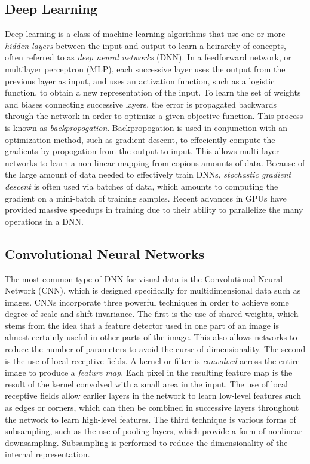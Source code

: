 \documentclass{article}
\begin{document}
\subsection{Deep Learning}
Deep learning is a class of machine learning algorithms that use one or more \textit{hidden layers} between the input and output
to learn a heirarchy of concepts, often referred to as \textit{deep neural networks} (DNN).
In a feedforward network, or multilayer perceptron (MLP), each successive layer uses the output
from the previous layer as input, and uses an activation function, such as a logistic function, to obtain a new representation of the input. To
learn the set of weights and biases connecting successive layers, the error is propagated backwards through the network in order to optimize a
given objective function. This process is known as \textit{backpropogation}. Backpropogation is used in conjunction with an optimization method,
such as gradient descent, to effeciently compute the gradients by propogation from the output to input. This allows multi-layer networks to learn
a non-linear mapping from copious amounts of data. Because of the large amount of data needed to effectively train DNNs, \textit{stochastic gradient descent}
is often used via batches of data, which amounts to computing the gradient on a mini-batch of training samples. Recent advances in GPUs have
provided massive speedups in training due to their ability to parallelize the many operations in a DNN. \newline

\subsection{Convolutional Neural Networks}
\noindent The most common type of DNN for visual data is the Convolutional Neural Network (CNN), which is designed specifically for
multidimensional data such as images. CNNs incorporate three powerful techniques in order to achieve some degree of scale and shift invariance.
The first is the use of shared weights, which stems from the idea that a feature detector used in one part of an image is almost certainly useful in
other parts of the image. This also allows networks to reduce the number of parameters to avoid the curse of dimensionality. The second is the use of
local receptive fields. A kernel or filter is \textit{convolved} across the entire
image to produce a \textit{feature map}. Each pixel in the resulting feature map is the result of the kernel convolved with a small area in the input.
The use of local receptive fields allow earlier layers in the network to learn low-level features such as edges or corners, which can then be combined
in successive layers throughout the network to learn high-level features. The third technique is various forms of subsampling, such as the use of pooling
layers, which provide a form of nonlinear downsampling. Subsampling is performed to reduce the dimensionality of the internal representation. \newline
\end{document}
